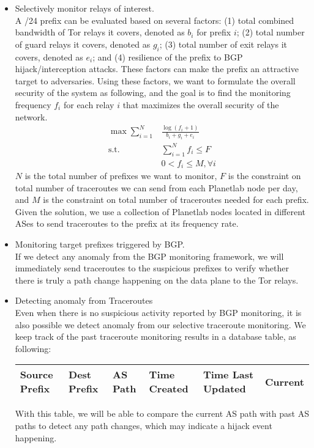 \begin{itemize}
\item Selectively monitor relays of interest.\\
A /24 prefix can be evaluated based on several factors: (1) total combined bandwidth of Tor relays it covers, denoted as $b_i$ for prefix $i$; (2) total number of guard relays it covers, denoted as $g_i$; (3) total number of exit relays it covers, denoted as $e_i$; and (4) resilience of the prefix to BGP hijack/interception attacks. These factors can make the prefix an attractive target to adversaries. Using these factors, we want to formulate the overall security of the system as following, and the goal is to find the monitoring frequency $f_i$ for each relay $i$ that maximizes the overall security of the network. \\
\begin{align}
\max \sum_{i=1}^N & \frac {\log {(f_i + 1)}} {b_i + g_i + e_i}\\
\text{s.t. } &\sum_{i=1}^N f_i \leq F\\
&0 < f_i \leq M, \forall i
\end{align}
$N$ is the total number of prefixes we want to monitor, $F$ is the constraint on total number of traceroutes we can send from each Planetlab node per day, and $M$ is the constraint on total number of traceroutes needed for each prefix. Given the solution, we use a collection of Planetlab nodes located in different ASes to send traceroutes to the prefix at its frequency rate. 
\item Monitoring target prefixes triggered by BGP.\\
If we detect any anomaly from the BGP monitoring framework, we will immediately send traceroutes to the suspicious prefixes to verify whether there is truly a path change happening on the data plane to the Tor relays. 
\item Detecting anomaly from Traceroutes\\
Even when there is no suspicious activity reported by BGP monitoring, it is also possible we detect anomaly from our selective traceroute monitoring. We keep track of the past traceroute monitoring results in a database table, as following:
\begin{center}
\begin{tabular}{ p{8mm} | p{8mm} | p{6mm} | p{1cm} | p{1.1cm} | p{8mm}}
  \hline			
  Source Prefix & Dest Prefix & AS Path & Time Created & Time Last Updated & Current \\
  \hline  
\end{tabular}
\label{tab:pathinfo}
\end{center}
With this table, we will be able to compare the current AS path with past AS paths to detect any path changes, which may indicate a hijack event happening. 

\end{itemize}


